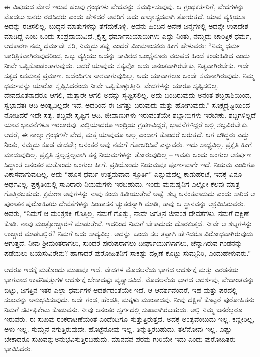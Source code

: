 ಈ ವಿಷಯದ ಮೇಲೆ ಇರುವ ಹಲವು ಗ್ರಂಥಗಳು ವೇದವನ್ನು ಸಮರ್ಥಿಸುವುವು. ಆ ಗ್ರಂಥಕರ್ತರಿಗೆ, ವೇದಗಳನ್ನು ಮೊದಲು ಜನರು ರಚಿಸಿದರು ಎಂದು ಹೇಳಿದರೆ ಅವರಿಗೆ ಅದು ಹಾಸ್ಯಾಸ್ಪದವಾಗಿ ತೋರುತ್ತದೆ. ಯಾವ ವ್ಯಕ್ತಿಯೂ ಅದನ್ನು ರಚಿಸಲಿಲ್ಲ. ಬುದ್ಧನ ಮಾತುಗಳನ್ನು ತೆಗೆದುಕೊಳ್ಳಿ. ಅವನು ಹಿಂದಿನ ಅನೇಕ ಜನ್ಮಗಳಲ್ಲಿ ಅದನ್ನೇ ಉಪದೇಶ ಮಾಡಿದ್ದ ಎಂಬ ಒಂದು ಸಂಪ್ರದಾಯವಿದೆ. ಕ್ರೈಸ್ತ ಧರ್ಮಾನುಯಾಯಿಗಳು ಎದ್ದು ನಿಂತು, ನಮ್ಮದು ಚಾರಿತ್ರಿಕ ಧರ್ಮ, ಆದಕಾರಣ ನಮ್ಮ ಧರ್ಮವೇ ಸರಿ, ನಿಮ್ಮದು ತಪ್ಪು ಎಂದರೆ ಮೀಮಾಂಸಕರು ಹೀಗೆ ಹೇಳುವರು: “ನಿಮ್ಮ ಧರ್ಮ ಚಾರಿತ್ರಿಕವಾಗಿರುವುದರಿಂದ, ಒಬ್ಬ ವ್ಯಕ್ತಿಯು ಅದನ್ನು ಸಾವಿರದ ಒಂಭೈನೂರು ವರುಷದ ಹಿಂದೆ ಕಂಡುಹಿಡಿದ ಎಂದು ನೀವೇ ಒಪ್ಪಿಕೊಂಡಂತಾಗುವುದು. ಆದರೆ ಯಾವುದು ಸತ್ಯವೋ ಅದು ಅನಂತವಾಗಿರಬೇಕು, ನಿತ್ಯವಾಗಿರಬೇಕು. ಇದೇ ಸತ್ಯದ ಏಕಮಾತ್ರ ಪ್ರಮಾಣ. ಅದೆಂದಿಗೂ ನಾಶವಾಗುವುದಿಲ್ಲ. ಅದು ಯಾವಾಗಲೂ ಒಂದೇ ಸಮನಾಗಿರುವುದು. ನಿಮ್ಮ ಧರ್ಮವನ್ನು ಯಾರೋ ಸೃಷ್ಟಿಸಿದರೆಂದು ನೀವೇ ಒಪ್ಪಿಕೊಳ್ಳುತ್ತೀರಿ. ವೇದಗಳನ್ನು ಯಾರೂ ಸೃಷ್ಟಿಸ\-ಲಿಲ್ಲ. ದೇವದೂತನಾದರೂ ಆಗಲಿ, ಮತ್ತಾರೇ ಆಗಲಿ ಅದನ್ನು ಸೃಷ್ಟಿಸಲಿಲ್ಲ. ಅದು ಬಂದಿರುವುದು ಅನಂತ ಶಬ್ದರಾಶಿಯಿಂದ, ಸ್ವಭಾವತಃ ಆದಿ ಅಂತ್ಯವಿಲ್ಲದೇ ಇದೆ. ಅದರಿಂದ ಈ ಜಗತ್ತು ಬರುವುದು ಮತ್ತು ಹೋಗುವುದು.” ಸೂಕ್ಷ್ಮದೃಷ್ಟಿಯಿಂದ ನೋಡಿದರೆ ಇದೇ ಸತ್ಯ. ಶಬ್ದವೇ ಸೃಷ್ಟಿಗೆ ಆದಿ. ಜೀವಾಣುಗಳು ಇರುವಂತೆಯೇ ಶಬ್ದಾಣುಗಳು ಇರಬೇಕು. ಶಬ್ದಗಳಿಲ್ಲದೆ ಯಾವ ಭಾವನೆಗಳೂ ಇರಲಾರವು. ಎಲ್ಲಿಯಾದರೂ ಇಂದ್ರಿಯ ಗ್ರಹಣವಿದ್ದರೆ, ಭಾವನೆಗಳಿದ್ದರೆ ಅಲ್ಲಿ ಶಬ್ದವಿರಬೇಕು. ಆದರೆ, ಈ ನಾಲ್ಕು ಗ್ರಂಥಗಳೇ ವೇದ, ಮತ್ತೆ ಯಾವುದೂ ಅಲ್ಲ ಎಂದಾಗ ತೊಂದರೆ ಬರುತ್ತದೆ. ಆಗ ಬೌದ್ಧರು ಎದ್ದು ನಿಂತು, ನಮ್ಮದು ಕೂಡ ವೇದವೇ; ಆನಂತರ ಅವು ನಮಗೆ ಗೋಚರಿಸಿವೆ ಎನ್ನುವರು. ಇದು ಸಾಧ್ಯವಿಲ್ಲ. ಪ್ರಕೃತಿ ಹೀಗೆ ಮಾಡುವುದಿಲ್ಲ. ಪ್ರಕೃತಿ ಸ್ವಲ್ಪಸ್ವಲ್ಪವಾಗಿ ತನ್ನ ನಿಯಮಗಳನ್ನು ತೋರುವುದಿಲ್ಲ – ಇವತ್ತು ಒಂದು ಅಂಗುಲ ಆಕರ್ಷಣ ಸಿದ್ಧಾಂತ ಆನಂತರ ಮತ್ತೊಂದು ಅಂಗುಲ ಹೀಗೆ. ಪ್ರತಿಯೊಂದು ನಿಯಮವೂ ಪೂರ್ಣವಾಗೇ ಇದೆ. ನಿಯಮ ಎಂದಿಗೂ ವಿಕಾಸವಾಗುವುದಿಲ್ಲ. ಅದು “ಹೊಸ ಧರ್ಮ ಉತ್ತಮವಾದ ಸ್ಛೂರ್ತಿ” ಎನ್ನುವುದೆಲ್ಲ ಕಾಡುಹರಟೆ, ಇದಕ್ಕೆ ಏನೂ ಅರ್ಥವಿಲ್ಲ. ಪ್ರಕೃತಿಯಲ್ಲಿ ಸಾವಿರಾರು ನಿಯಮಗಳು ಇರಬಹುದು. ಇಂದು ಮನುಷ್ಯನಿಗೆ ಎಲ್ಲೋ ಕೆಲವು ಮಾತ್ರ ಗೊತ್ತಿರಬಹುದು. ಕ್ರಮೇಣ ಅವುಗಳನ್ನು ನಾವು ಕಂಡು ಹಿಡಿಯುತ್ತೇವೆ ಅಷ್ಟೆ. ಶಬ್ದ ಅನಂತವಾದುದು ಎಂದು ಸಾರಿದ ಆ ಪುರಾತನ ಪುರೋಹಿತರು ದೇವತೆಗಳನ್ನು ಸಿಂಹಾಸನ ಚ್ಯುತರನ್ನಾಗಿ ಮಾಡಿ, ತಾವು ಆ ಸ್ಥಾನವನ್ನು ಆಕ್ರಮಿಸಿರುವರು. ಅವರು, “ನಿಮಗೆ ಆ ಮಂತ್ರಶಕ್ತಿ ಗೊತ್ತಿಲ್ಲ, ನಮಗೆ ಗೊತ್ತು, ನಾವೇ ಜಗತ್ತಿನ ಜೀವಂತ ದೇವತೆಗಳು. ನಮಗೆ ದಕ್ಷಿಣೆ ಕೊಡಿ. ನಾವು ಮಂತ್ರೋಚ್ಚಾರಣೆ ಮಾಡುತ್ತೇವೆ. ಇದರಿಂದ ನಿಮಗೆ ಬೇಕಾದುದು ದೊರಕುತ್ತದೆ. ನೀವೇ ಆ ಶಬ್ದಗಳನ್ನು ಉಚ್ಚಾರ ಮಾಡಬಲ್ಲಿರೆ? ನಿಮಗೆ ಅದು ಸಾಧ್ಯವಿಲ್ಲ. ಅದನ್ನು ಒಂದು ಸಲ ತಪ್ಪಾಗಿ ಹೇಳಿದರೂ ವಿರೋಧವಾಗಿರುವುದು ಆಗುತ್ತದೆ. ನೀವು ಶ‍್ರೀಮಂತರಾಗಲು, ಸುಂದರ ಪುರುಷರಾಗಲು ದೀರ್ಘಾಯುಗಳಾಗಲು, ಚೆನ್ನಾಗಿರುವ ಗಂಡನನ್ನು ಪಡೆಯಲು ಬಯಸುವಿ\-ರೇನು? ಹಾಗಾದರೆ ಪುರೋಹಿತನಿಗೆ ಸಾಕಷ್ಟು ದಕ್ಷಿಣೆ ಕೊಟ್ಟು ಸುಮ್ಮನಿರಿ, ಎಂದು\break ಹೇಳುವರು.”

ಆದರೂ ಇದಕ್ಕೆ ಮತ್ತೊಂದು ಮುಖವೂ ಇದೆ. ವೇದಗಳ ಮೊದಲನೆಯ ಭಾಗದ ಆದರ್ಶಕ್ಕೆ ಮತ್ತು ಎರಡನೆಯ ಭಾಗವಾದ ಉಪನಿಷತ್ತುಗಳ ಆದರ್ಶಕ್ಕೆ ಬೇಕಾದಷ್ಟು ವ್ಯತ್ಯಾಸವಿದೆ. ಮೊದಲನೆಯ ಭಾಗದ ಆದರ್ಶವು, ವೇದಾಂತವನ್ನು ಬಿಟ್ಟು, ಜಗತ್ತಿನ ಇತರ ಎಲ್ಲಾ ಧರ್ಮಗಳ ಆದರ್ಶದಂತೆಯೇ ಇದೆ. ಆ ಆದರ್ಶವೆಂದರೆ, ಇಹ ಮತ್ತು ಪರದಲ್ಲಿ ಸುಖವನ್ನು ಅನುಭವಿಸುವುದು. ಅದೇ ಗಂಡ, ಹೆಂಡತಿ, ಮಕ್ಕಳು ಮುಂತಾದವು. ನೀವು ದಕ್ಷಿಣೆ ಕೊಟ್ಟರೆ ಪುರೋಹಿತನು ನಿಮಗೆ ಸರ್ಟಿಫಿಕೇಟು ಕೊಡುವನು. ನೀವು ಆನಂತರ ಸ್ವರ್ಗದಲ್ಲಿ ಸುಖವಾಗಿರಬಹುದು. ಅಲ್ಲಿ ನಿಮ್ಮ ಜನರೆಲ್ಲರೂ ಇರುವರು. ಈ ಸುಖವು ರಂಕರಾಟಣೆಯಂತೆ  ಎಂದೆಂದಿಗೂ ಸುತ್ತುತ್ತಿರುತ್ತದೆ. ಅದಕ್ಕೆ ಅಂತ್ಯವೆಂಬುದು ಇಲ್ಲ. ಕಣ್ಣೀರಿಲ್ಲ, ಅಳು ಇಲ್ಲ. ಸುಮ್ಮನೆ ನಗುತ್ತಿರುವುದೇ. ಹೊಟ್ಟೆನೋವು ಇಲ್ಲ. ತಿನ್ನುತ್ತಿರಬಹುದು. ತಲೆನೋವು ಇಲ್ಲ. ಎಷ್ಟು ಬೇಕಾದರೂ ಸುಖವನ್ನು\break ಅನುಭವಿಸುತ್ತಿರಬಹುದು. ಮಾನವನ ಪರಮ ಗುರಿಯೇ ಇದು ಎಂದು ಪುರೋಹಿತರು ಭಾವಿಸಿದರು.

